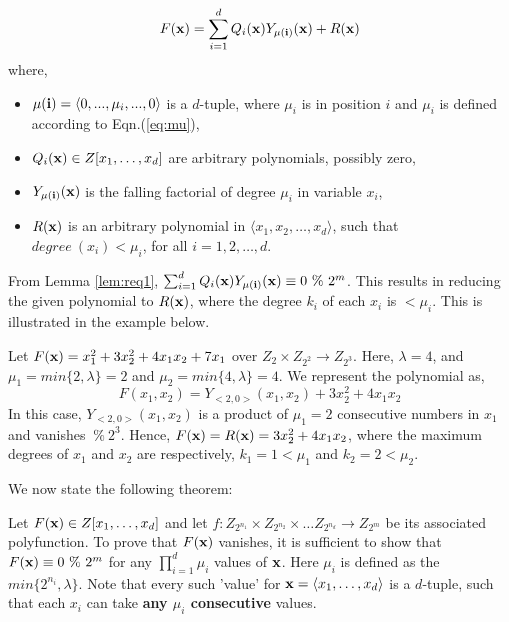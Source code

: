 \begin{equation}\label{eq:proof1_1}
F({\bf x}) =  \sum _{i=1}^d Q_i({\bf x}) Y_{{\bf \mu}(\textbf{i})}({\bf x}) + R({\bf x})
\end{equation}
where, 
\begin{itemize}
\item  ${\bf \mu(i)} = \langle 0,...,\mu_i, ...,0 \rangle$ is a $d$-tuple, where
  $\mu_i$ is in position $i$ and  $\mu_i$ is defined according to
  Eqn.(\ref{eq:mu}),
\item $Q_i({\bf x}) \in Z[x_1, \ldots, x_d]$ are arbitrary polynomials,
  possibly zero,
\item $Y_{\bf \mu(i)}({\bf x})$  is the falling factorial of degree $\mu_i$ in
  variable $x_i$,
\item $R({\bf x})$ is an arbitrary polynomial in $\langle x_1, x_2,
  \ldots, x_d \rangle$, such that $ degree ~(x_i) < \mu_i$, for all $i
  = 1, 2, \ldots, d$. 
\end{itemize}

From Lemma \ref{lem:req1}, $\sum _{i=1}^d Q_i({\bf x}) Y_{{\bf
    \mu}(\textbf{i})}({\bf x}) \equiv 0 ~\% ~2^m$. This results in
    reducing the given polynomial to $R({\bf x})$, where the degree
    $k_i$ of each $x_i$ is $< \mu_i$. This is illustrated in the
    example below.

\begin{Example} \label{ex:proof1_1}
Let $F({\bf x}) = x_1^2 + 3x_2^2 + 4x_1x_2 + 7x_1$ over $Z_{2}
\times Z_{2^2} \rightarrow Z_{2^3}$. Here, $\lambda = 4$, and $\mu_1 =
min\{2,\lambda\} = 2$ and $\mu_2 = min\{4,\lambda\} = 4$. We represent
the polynomial as,
\begin{equation}
F(x_1,x_2) = Y_{<2,0>}(x_1,x_2) + 3x_2^2 + 4x_1x_2 \nonumber
\end{equation}
In this case, $Y_{<2,0>}(x_1,x_2)$ is a product of $\mu_1 = 2$
consecutive numbers in $x_1$ and vanishes $~\% ~2^3$. Hence, $F({\bf
x}) = R({\bf x}) = 3x_2^2 + 4x_1x_2$, where the maximum degrees of
$x_1$ and $x_2$ are respectively, $k_1 = 1 < \mu_1$ and $k_2 = 2 < \mu_2$. 
\end{Example}

We now state the following theorem:

\begin{Theorem}\label{th:proof1}
Let $F({\bf x}) \in Z[x_1, \ldots, x_d]$ and let $f:Z_{2^{n_1}} \times
Z_{2^{n_2}} \times \ldots Z_{2^{n_d}} \to Z_{2^m}$ be its associated
polyfunction. To prove that $F({\bf x})$ vanishes, it is sufficient to
show that $F({\bf x}) \equiv 0 ~\% ~2^m$ for any $\prod_{i=1}^d \mu_i$
values of ${\bf x}$. Here $\mu_i$ is defined as the $min \{2^{n_i},
\lambda\}$. Note that every such 'value' for ${\bf x} = \langle x_1,
\ldots, x_d \rangle$ is a $d$-tuple, such that each $x_i$ can take
{\bf any $\mu_i$ consecutive} values.
\end{Theorem}

